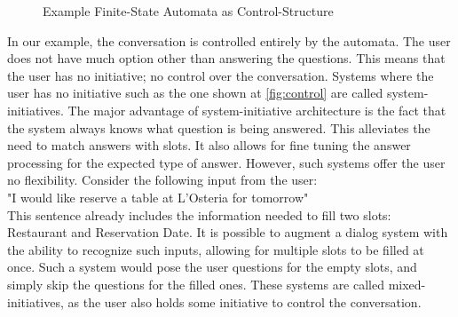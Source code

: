 \usetikzlibrary{automata,positioning}
\begin{figure}[htbp]
  \centering
  \caption[Example Finite-State Automata as Control-Structure]{Example Finite-State Automata as Control-Structure}\label{fig:control}
\end{figure}

In our example, the conversation is controlled entirely by the automata.
The user does not have much option other than answering the questions.
This means that the user has no initiative; no control over the conversation.
Systems where the user has no initiative such as the one shown at \autoref{fig:control} are called system-initiatives.
The major advantage of system-initiative architecture is the fact that the system always knows what question is being answered.
This alleviates the need to match answers with slots.
It also allows for fine tuning the answer processing for the expected type of answer.
However, such systems offer the user no flexibility.
Consider the following input from the user:\\
"I would like reserve a table at L'Osteria for tomorrow"\\
This sentence already includes the information needed to fill two slots: Restaurant and Reservation Date.
It is possible to augment a dialog system with the ability to recognize such inputs, allowing for multiple slots to be filled at once.
Such a system would pose the user questions for the empty slots, and simply skip the questions for the filled ones.
These systems are called mixed-initiatives, as the user also holds some initiative to control the conversation.
\newpage
